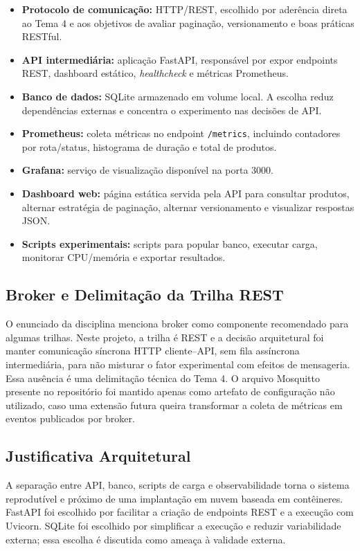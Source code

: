 \documentclass[journal]{IEEEtran}
\begin{document}
\begin{itemize}
    \item \textbf{Protocolo de comunicação:} HTTP/REST, escolhido por aderência direta ao Tema 4 e aos objetivos de avaliar paginação, versionamento e boas práticas RESTful.
    \item \textbf{API intermediária:} aplicação FastAPI, responsável por expor endpoints REST, dashboard estático, \textit{healthcheck} e métricas Prometheus.
    \item \textbf{Banco de dados:} SQLite armazenado em volume local. A escolha reduz dependências externas e concentra o experimento nas decisões de API.
    \item \textbf{Prometheus:} coleta métricas no endpoint \texttt{/metrics}, incluindo contadores por rota/status, histograma de duração e total de produtos.
    \item \textbf{Grafana:} serviço de visualização disponível na porta 3000.
    \item \textbf{Dashboard web:} página estática servida pela API para consultar produtos, alternar estratégia de paginação, alternar versionamento e visualizar respostas JSON.
    \item \textbf{Scripts experimentais:} scripts para popular banco, executar carga, monitorar CPU/memória e exportar resultados.
\end{itemize}

\subsection{Broker e Delimitação da Trilha REST}

O enunciado da disciplina menciona broker como componente recomendado para algumas trilhas. Neste projeto, a trilha é REST e a decisão arquitetural foi manter comunicação síncrona HTTP cliente--API, sem fila assíncrona intermediária, para não misturar o fator experimental com efeitos de mensageria. Essa ausência é uma delimitação técnica do Tema 4. O arquivo Mosquitto presente no repositório foi mantido apenas como artefato de configuração não utilizado, caso uma extensão futura queira transformar a coleta de métricas em eventos publicados por broker.

\subsection{Justificativa Arquitetural}

A separação entre API, banco, scripts de carga e observabilidade torna o sistema reprodutível e próximo de uma implantação em nuvem baseada em contêineres. FastAPI foi escolhido por facilitar a criação de endpoints REST e a execução com Uvicorn. SQLite foi escolhido por simplificar a execução e reduzir variabilidade externa; essa escolha é discutida como ameaça à validade externa.
\end{document}
